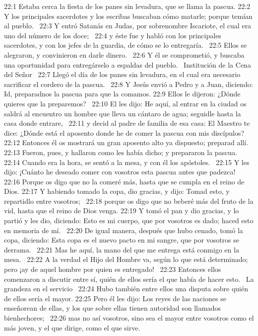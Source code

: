 22:1 Estaba cerca la fiesta de los panes sin levadura, que se llama la pascua. 
22:2 Y los principales sacerdotes y los escribas buscaban cómo matarle; porque temían al pueblo.  
22:3 Y entró Satanás en Judas, por sobrenombre Iscariote, el cual era uno del número de los doce;  
22:4 y éste fue y habló con los principales sacerdotes, y con los jefes de la guardia, de cómo se lo entregaría.  
22:5 Ellos se alegraron, y convinieron en darle dinero.  
22:6 Y él se comprometió, y buscaba una oportunidad para entregárselo a espaldas del pueblo.  
Institución de la Cena del Señor  
22:7 Llegó el día de los panes sin levadura, en el cual era necesario sacrificar el cordero de la pascua.  
22:8 Y Jesús envió a Pedro y a Juan, diciendo: Id, preparadnos la pascua para que la comamos. 
22:9 Ellos le dijeron: ¿Dónde quieres que la preparemos?  
22:10 El les dijo: He aquí, al entrar en la ciudad os saldrá al encuentro un hombre que lleva un cántaro de agua; seguidle hasta la casa donde entrare,  
22:11 y decid al padre de familia de esa casa: El Maestro te dice: ¿Dónde está el aposento donde he de comer la pascua con mis discípulos?  
22:12 Entonces él os mostrará un gran aposento alto ya dispuesto; preparad allí. 
22:13 Fueron, pues, y hallaron como les había dicho; y prepararon la pascua.  
22:14 Cuando era la hora, se sentó a la mesa, y con él los apóstoles.  
22:15 Y les dijo: ¡Cuánto he deseado comer con vosotros esta pascua antes que padezca!  
22:16 Porque os digo que no la comeré más, hasta que se cumpla en el reino de Dios. 
22:17 Y habiendo tomado la copa, dio gracias, y dijo: Tomad esto, y repartidlo entre vosotros;  
22:18 porque os digo que no beberé más del fruto de la vid, hasta que el reino de Dios venga. 
22:19 Y tomó el pan y dio gracias, y lo partió y les dio, diciendo: Esto es mi cuerpo, que por vosotros es dado; haced esto en memoria de mí.  
22:20 De igual manera, después que hubo cenado, tomó la copa, diciendo: Esta copa es el nuevo pacto en mi sangre, que por vosotros se derrama.  
22:21 Mas he aquí, la mano del que me entrega está conmigo en la mesa.  
22:22 A la verdad el Hijo del Hombre va, según lo que está determinado; pero ¡ay de aquel hombre por quien es entregado!  
22:23 Entonces ellos comenzaron a discutir entre sí, quién de ellos sería el que había de hacer esto.  
La grandeza en el servicio  
22:24 Hubo también entre ellos una disputa sobre quién de ellos sería el mayor. 
22:25 Pero él les dijo: Los reyes de las naciones se enseñorean de ellas, y los que sobre ellas tienen autoridad son llamados bienhechores;  
22:26 mas no así vosotros, sino sea el mayor entre vosotros como el más joven, y el que dirige, como el que sirve.  
